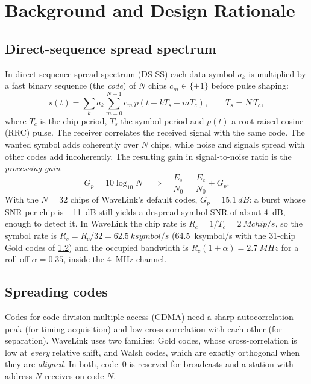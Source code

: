 \documentclass[11pt,a4paper,oneside]{report}
\begin{document}
\chapter{Background and Design Rationale}\label{ch:background}

\section{Direct-sequence spread spectrum}\label{sec:dsss}
In direct-sequence spread spectrum (DS-SS) each data symbol $a_k$ is multiplied by a fast binary
sequence (the \emph{code}) of $N$ chips $c_m\in\{\pm1\}$ before pulse shaping:
\begin{equation}
  s(t)=\sum_{k} a_k \sum_{m=0}^{N-1} c_m\, p\!\left(t-kT_s-mT_c\right),\qquad T_s=N\,T_c ,
  \label{eq:dsss}
\end{equation}
where $T_c$ is the chip period, $T_s$ the symbol period and $p(t)$ a root-raised-cosine (RRC)
pulse. The receiver correlates the received signal with the same code. The wanted symbol adds
coherently over $N$ chips, while noise and signals spread with other codes add incoherently.
The resulting gain in signal-to-noise ratio is the \emph{processing gain}
\begin{equation}
  G_p = 10\log_{10} N \quad\Rightarrow\quad \frac{E_s}{N_0}=\frac{E_c}{N_0}+G_p .
  \label{eq:pg}
\end{equation}
With the $N=32$ chips of WaveLink's default codes, $G_p=\SI{15.1}{dB}$: a burst whose SNR per chip
is \SI{-11}{dB} still yields a despread symbol SNR of about \SI{4}{dB}, enough to detect it. In
WaveLink the chip rate is $R_c=1/T_c=\SI{2}{Mchip/s}$, so the symbol rate is
$R_s=R_c/32=\SI{62.5}{ksymbol/s}$ (\SI{64.5}{ksymbol/s} with the 31-chip Gold codes of
\cref{sec:gold}) and the occupied bandwidth is $R_c(1+\alpha)=\SI{2.7}{MHz}$ for a roll-off
$\alpha=0.35$, inside the \SI{4}{MHz} channel.

\section{Spreading codes}\label{sec:gold}
Codes for code-division multiple access (CDMA) need a sharp autocorrelation peak (for timing
acquisition) and low cross-correlation with each other (for separation). WaveLink uses two families:
Gold codes, whose cross-correlation is low at \emph{every} relative shift, and Walsh codes, which are
exactly orthogonal when they are \emph{aligned}. In both, code~0 is reserved for broadcasts and a
station with address $N$ receives on code $N$.
\end{document}

